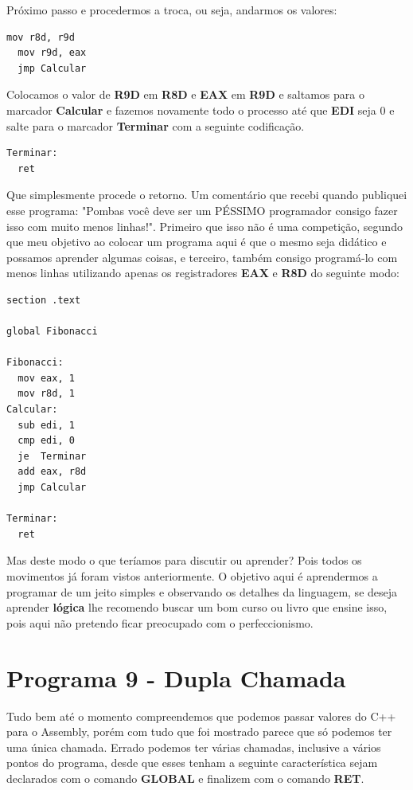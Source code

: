 Próximo passo e procedermos a troca, ou seja, andarmos os valores:
\begin{lstlisting}[]
  mov r8d, r9d
  mov r9d, eax
  jmp Calcular
\end{lstlisting}

Colocamos o valor de \textbf{R9D} em \textbf{R8D} e \textbf{EAX} em \textbf{R9D} e saltamos para o marcador \textbf{Calcular} e fazemos novamente todo o processo até que \textbf{EDI} seja 0 e salte para o marcador \textbf{Terminar} com a seguinte codificação.
\begin{lstlisting}[]
Terminar:
  ret	
\end{lstlisting}

Que simplesmente procede o retorno. Um comentário que recebi quando publiquei esse programa: "Pombas você deve ser um PÉSSIMO programador consigo fazer isso com muito menos linhas!". Primeiro que isso não é uma competição, segundo que meu objetivo ao colocar um programa aqui é que o mesmo seja didático e possamos aprender algumas coisas, e terceiro, também consigo programá-lo com menos linhas utilizando apenas os registradores \textbf{EAX} e \textbf{R8D} do seguinte modo:
\begin{lstlisting}[]
section .text

global Fibonacci

Fibonacci:
  mov eax, 1
  mov r8d, 1
Calcular:
  sub edi, 1 
  cmp edi, 0
  je  Terminar
  add eax, r8d
  jmp Calcular

Terminar:
  ret
\end{lstlisting}

Mas deste modo o que teríamos para discutir ou aprender? Pois todos os movimentos já foram vistos anteriormente. O objetivo aqui é aprendermos a programar de um jeito simples e observando os detalhes da linguagem, se deseja aprender \textbf{lógica} lhe recomendo buscar um bom curso ou livro que ensine isso, pois aqui não pretendo ficar preocupado com o perfeccionismo.

\section{Programa 9 - Dupla Chamada}
Tudo bem até o momento compreendemos que podemos passar valores do C++ para o Assembly, porém com tudo que foi mostrado parece que só podemos ter uma única chamada. Errado podemos ter várias chamadas, inclusive a vários pontos do programa, desde que esses tenham a seguinte característica sejam declarados com o comando \textbf{GLOBAL} e finalizem com o comando \textbf{RET}. 


